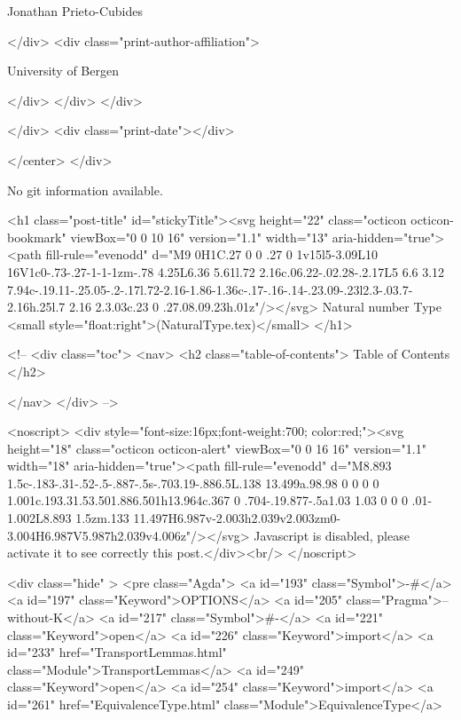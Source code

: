                   Jonathan Prieto-Cubides
                
              </div>
              <div class="print-author-affiliation">
                
                  University of Bergen
                
                </div>
            </div>
          </div>
          
          
        </div>
        <div class="print-date"></div>
        
        
    </center>
  </div>

  
  No git information available.
  

  <h1 class="post-title" id="stickyTitle"><svg height="22" class="octicon octicon-bookmark" viewBox="0 0 10 16" version="1.1" width="13" aria-hidden="true"><path fill-rule="evenodd" d="M9 0H1C.27 0 0 .27 0 1v15l5-3.09L10 16V1c0-.73-.27-1-1-1zm-.78 4.25L6.36 5.61l.72 2.16c.06.22-.02.28-.2.17L5 6.6 3.12 7.94c-.19.11-.25.05-.2-.17l.72-2.16-1.86-1.36c-.17-.16-.14-.23.09-.23l2.3-.03.7-2.16h.25l.7 2.16 2.3.03c.23 0 .27.08.09.23h.01z"/></svg> Natural number Type <small style="float:right">(NaturalType.tex)</small>
  </h1>

  <!-- 
  <div class="toc">
    <nav>
    <h2 class="table-of-contents"> Table of Contents </h2>
      

    </nav>
  </div>
   -->

  <noscript>
  <div style="font-size:16px;font-weight:700; color:red;"><svg height="18" class="octicon octicon-alert" viewBox="0 0 16 16" version="1.1" width="18" aria-hidden="true"><path fill-rule="evenodd" d="M8.893 1.5c-.183-.31-.52-.5-.887-.5s-.703.19-.886.5L.138 13.499a.98.98 0 0 0 0 1.001c.193.31.53.501.886.501h13.964c.367 0 .704-.19.877-.5a1.03 1.03 0 0 0 .01-1.002L8.893 1.5zm.133 11.497H6.987v-2.003h2.039v2.003zm0-3.004H6.987V5.987h2.039v4.006z"/></svg> Javascript is disabled, please activate it to see correctly this post.</div><br/>
  </noscript>

  <div class="hide" >
<pre class="Agda">
<a id="193" class="Symbol">{-#</a> <a id="197" class="Keyword">OPTIONS</a> <a id="205" class="Pragma">--without-K</a> <a id="217" class="Symbol">#-}</a>
<a id="221" class="Keyword">open</a> <a id="226" class="Keyword">import</a> <a id="233" href="TransportLemmas.html" class="Module">TransportLemmas</a>
<a id="249" class="Keyword">open</a> <a id="254" class="Keyword">import</a> <a id="261" href="EquivalenceType.html" class="Module">EquivalenceType</a>

